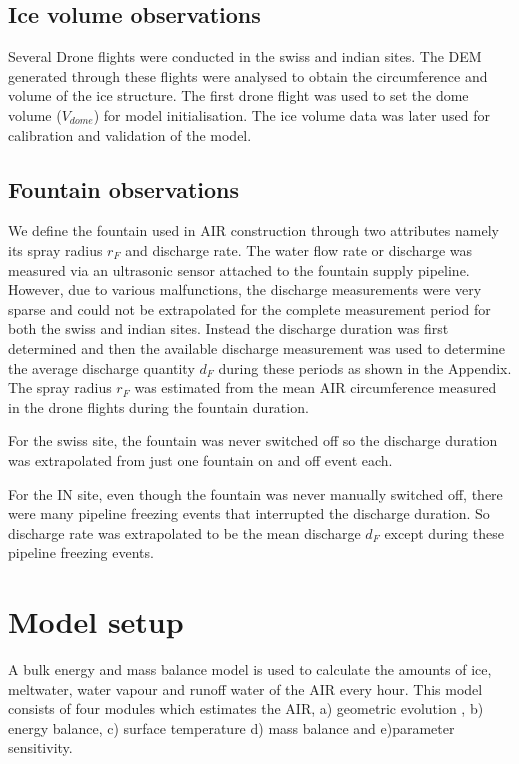\documentclass[utf8]{frontiersSCNS} %
\begin{document}
\subsection{Ice volume observations}
Several Drone flights were conducted in the swiss and indian sites. The DEM generated through these flights were
analysed to obtain the circumference and volume of the ice structure. The first drone flight was used to set the dome volume
($V_{dome}$) for model initialisation. The ice volume data was later used for calibration and validation of the model. 

\subsection{Fountain observations} 
We define the fountain used in AIR construction through two attributes namely its spray radius $r_F$ and discharge
rate. The water flow rate or discharge was measured via an ultrasonic sensor attached to the fountain supply pipeline.
However, due to various malfunctions, the discharge measurements were very sparse and could not be extrapolated for the
complete measurement period for both the swiss and indian sites. Instead the discharge duration was first determined and
then the available discharge measurement was used to determine the average discharge quantity $d_F$ during these
periods as shown in the Appendix. The spray radius $r_F$ was estimated from the mean AIR circumference measured in
the drone flights during the fountain duration.  

For the swiss site, the fountain was never switched off so the discharge duration was extrapolated from just one fountain
on and off event each.  

For the IN site, even though the fountain was never manually switched off, there were many pipeline freezing events that
interrupted the discharge duration. So discharge rate was extrapolated to be the mean discharge $d_F$ except during
these pipeline freezing events.

\section{Model setup}

A bulk energy and mass balance model is used to calculate the amounts of ice, meltwater, water vapour and runoff water
of the AIR every hour. This model consists of four modules which estimates the AIR, a) geometric evolution , b) energy
balance, c) surface temperature d) mass balance and e)parameter sensitivity. 
\end{document}
